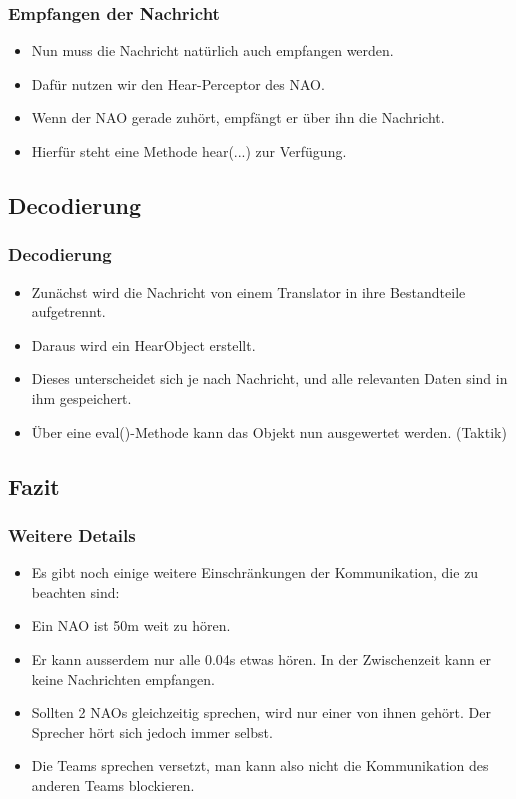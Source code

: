 \frame
{
  \frametitle{Empfangen der Nachricht}
  
  \begin{itemize}
    \item<1-> Nun muss die Nachricht nat\"urlich auch empfangen werden.
    \item<2-> Daf\"ur nutzen wir den Hear-Perceptor des NAO.
    \item<3-> Wenn der NAO gerade zuh\"ort, empf\"angt er \"uber ihn die Nachricht.
    \item<4-> Hierf\"ur steht eine Methode hear(...) zur Verf\"ugung.
  \end{itemize}
}

\subsection{Decodierung}
\frame
{
  \frametitle{Decodierung}
  
  \begin{itemize}
    \item<1-> Zun\"achst wird die Nachricht von einem Translator in ihre Bestandteile aufgetrennt.
    \item<2-> Daraus wird ein HearObject erstellt.
    \item<3-> Dieses unterscheidet sich je nach Nachricht, und alle relevanten Daten sind in ihm gespeichert.
    \item<4-> \"Uber eine eval()-Methode kann das Objekt nun ausgewertet werden. (Taktik)
  \end{itemize}
}

\subsection{Fazit}
\frame
{
  \frametitle{Weitere Details}
  
  \begin{itemize}
    \item<1-> Es gibt noch einige weitere Einschr\"ankungen der Kommunikation, die zu beachten sind: \vskip0.5cm
    \item<2-> Ein NAO ist 50m weit zu h\"oren.
    \item<3-> Er kann ausserdem nur alle 0.04s etwas h\"oren. In der Zwischenzeit kann er keine Nachrichten empfangen.
    \item<4-> Sollten 2 NAOs gleichzeitig sprechen, wird nur einer von ihnen geh\"ort. Der Sprecher h\"ort sich jedoch immer selbst.
    \item<5-> Die Teams sprechen versetzt, man kann also nicht die Kommunikation des anderen Teams blockieren.
  \end{itemize}
}


